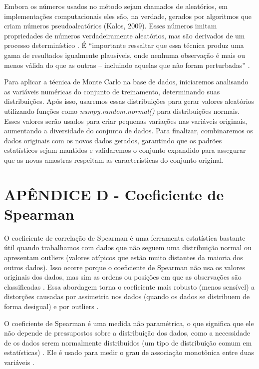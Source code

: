 \begin{apendicesenv}
Embora os números usados no método sejam chamados de aleatórios, em implementações computacionais eles são, na verdade, gerados por algoritmos que criam números pseudoaleatórios (Kalos, 2009). Esses números imitam propriedades de números verdadeiramente aleatórios, mas são derivados de um processo determinístico \cite{kalos2009}. É “importante ressaltar que essa técnica produz uma gama de resultados igualmente plausíveis, onde nenhuma observação é mais ou menos válida do que as outras – incluindo aquelas que não foram perturbadas” \cite{kiar2021}.

Para aplicar a técnica de Monte Carlo na base de dados, iniciaremos analisando as variáveis numéricas do conjunto de treinamento, determinando suas distribuições. Após isso, usaremos essas distribuições para gerar valores aleatórios utilizando funções como \textit{numpy.random.normal()} para distribuições normais. Esses valores serão usados para criar pequenas variações nas variáveis originais, aumentando a diversidade do conjunto de dados. Para finalizar, combinaremos os dados originais com os novos dados gerados, garantindo que os padrões estatísticos sejam mantidos e validaremos o conjunto expandido para assegurar que as novas amostras respeitam as características do conjunto original.

\chapter{APÊNDICE D - Coeficiente de Spearman}

O coeficiente de correlação de Spearman é uma ferramenta estatística bastante útil quando trabalhamos com dados que não seguem uma distribuição normal ou apresentam outliers (valores atípicos que estão muito distantes da maioria dos outros dados). Isso ocorre porque o coeficiente de Spearman não usa os valores originais dos dados, mas sim as ordens ou posições em que as observações são classificadas \cite{sousa2019}. Essa abordagem torna o coeficiente mais robusto (menos sensível) a distorções causadas por assimetria nos dados (quando os dados se distribuem de forma desigual) e por outliers \cite{sousa2019}.

O coeficiente de Spearman é uma medida não paramétrica, o que significa que ele não depende de pressupostos sobre a distribuição dos dados, como a necessidade de os dados serem normalmente distribuídos (um tipo de distribuição comum em estatísticas) \cite{restrepo2007}. Ele é usado para medir o grau de associação monotônica entre duas variáveis \cite{restrepo2007}.


\end{apendicesenv}

